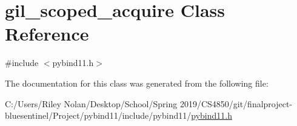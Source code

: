\hypertarget{classgil__scoped__acquire}{}\section{gil\+\_\+scoped\+\_\+acquire Class Reference}
\label{classgil__scoped__acquire}


{\ttfamily \#include $<$pybind11.\+h$>$}



The documentation for this class was generated from the following file\+:\begin{DoxyCompactItemize}
\item 
C\+:/\+Users/\+Riley Nolan/\+Desktop/\+School/\+Spring 2019/\+C\+S4850/git/finalproject-\/bluesentinel/\+Project/pybind11/include/pybind11/\mbox{\hyperlink{pybind11_8h}{pybind11.\+h}}\end{DoxyCompactItemize}
